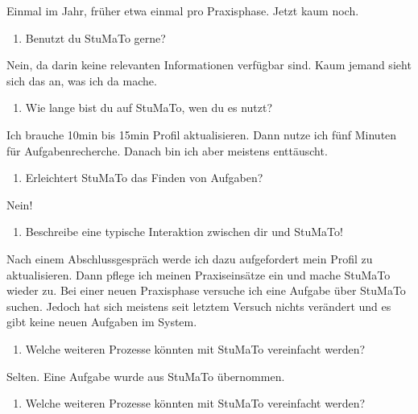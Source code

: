 \documentclass[
  12pt,
  ngerman,
  a4paper,
]{article}
\providecommand{\tightlist}{%
  \setlength{\itemsep}{0pt}\setlength{\parskip}{0pt}}
\begin{document}
Einmal im Jahr, früher etwa einmal pro Praxisphase. Jetzt kaum noch.

\begin{enumerate}
\def\labelenumi{\arabic{enumi}.}
\setcounter{enumi}{11}
\tightlist
\item
  Benutzt du StuMaTo gerne?
\end{enumerate}

Nein, da darin keine relevanten Informationen verfügbar sind. Kaum
jemand sieht sich das an, was ich da mache.

\begin{enumerate}
\def\labelenumi{\arabic{enumi}.}
\setcounter{enumi}{12}
\tightlist
\item
  Wie lange bist du auf StuMaTo, wen du es nutzt?
\end{enumerate}

Ich brauche 10min bis 15min Profil aktualisieren. Dann nutze ich fünf
Minuten für Aufgabenrecherche. Danach bin ich aber meistens enttäuscht.

\begin{enumerate}
\def\labelenumi{\arabic{enumi}.}
\setcounter{enumi}{13}
\tightlist
\item
  Erleichtert StuMaTo das Finden von Aufgaben?
\end{enumerate}

Nein!

\begin{enumerate}
\def\labelenumi{\arabic{enumi}.}
\setcounter{enumi}{14}
\tightlist
\item
  Beschreibe eine typische Interaktion zwischen dir und StuMaTo!
\end{enumerate}

Nach einem Abschlussgespräch werde ich dazu aufgefordert mein Profil zu
aktualisieren. Dann pflege ich meinen Praxiseinsätze ein und mache
StuMaTo wieder zu. Bei einer neuen Praxisphase versuche ich eine Aufgabe
über StuMaTo suchen. Jedoch hat sich meistens seit letztem Versuch
nichts verändert und es gibt keine neuen Aufgaben im System.

\begin{enumerate}
\def\labelenumi{\arabic{enumi}.}
\setcounter{enumi}{15}
\tightlist
\item
  Welche weiteren Prozesse könnten mit StuMaTo vereinfacht werden?
\end{enumerate}

Selten. Eine Aufgabe wurde aus StuMaTo übernommen.

\begin{enumerate}
\def\labelenumi{\arabic{enumi}.}
\setcounter{enumi}{16}
\tightlist
\item
  Welche weiteren Prozesse könnten mit StuMaTo vereinfacht werden?
\end{enumerate}
\end{document}
